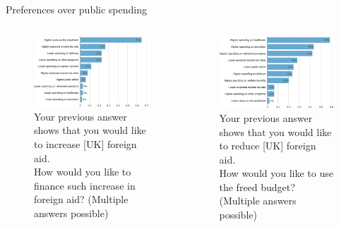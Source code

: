 \begin{framefont}{\small}
\begin{frame}{Preferences over public spending%
	\label{}}
	\begin{columns}
        \begin{column}{0.5\textwidth}
            \begin{figure}
				\vspace{-.2cm}
                \centering 
                \caption{Your previous answer shows that you would like to increase [UK] foreign aid.\\How would you like to finance such increase in foreign aid? (Multiple answers possible)}
                \vspace{-.2cm}
                \includegraphics[width=\columnwidth]{../figures/all/foreign_aid_raise.pdf} 
            \end{figure}
        \end{column}
        \begin{column}{0.5\textwidth}			
            \begin{figure}\vspace{-.2cm}
                \centering 
                \caption{Your previous answer shows that you would like to reduce [UK] foreign aid.\\How would you like to use the freed budget? (Multiple answers possible)}
                \vspace{-.2cm}
                \includegraphics[width=\columnwidth]{../figures/all/foreign_aid_reduce.pdf} 

\end{figure}
\end{column}
\end{columns}
\end{frame}
\end{framefont}
